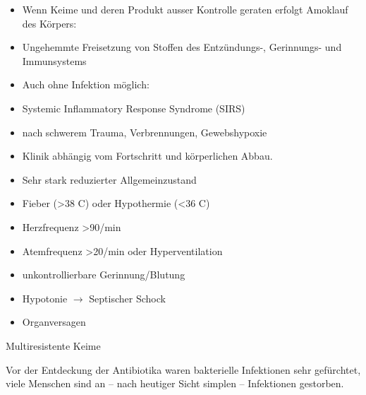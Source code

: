 \documentclass{article}
\newcommand\gZ[1]{\textcolor[rgb]{0.5019608,0.5019608,0.5019608}{#1}}
\begin{document}
\begin{itemize}
\item {\mdseries
Wenn Keime und deren Produkt ausser Kontrolle geraten erfolgt Amoklauf
des K\"orpers:}

\item {\mdseries
Ungehemmte Freisetzung von Stoffen des Entz\"undungs-, Gerinnungs- und
Immunsystems}

\item {\mdseries
Auch ohne Infektion m\"oglich:}

\end{itemize}
\begin{itemize}
\item {\mdseries
\gZ{Systemic Inflammatory Response Syndrome (SIRS) }}

\end{itemize}
\begin{itemize}
\item {\mdseries
nach schwerem Trauma, Verbrennungen, Gewebshypoxie}

\item {\mdseries
Klinik abh\"angig vom Fortschritt und k\"orperlichen Abbau.}

\end{itemize}
\begin{itemize}
\item {\mdseries
Sehr stark reduzierter Allgemeinzustand}

\item {\mdseries
Fieber ({\textgreater}38{\textdegree} C) oder Hypothermie
({\textless}36{\textdegree} C)}

\item {\mdseries
Herzfrequenz {\textgreater}90/min}

\item {\mdseries
Atemfrequenz {\textgreater}20/min oder Hyperventilation}

\item {\mdseries
unkontrollierbare Gerinnung/Blutung}

\item {\mdseries
Hypotonie ${\rightarrow}$ Septischer Schock}

\item {\mdseries
Organversagen  }

\end{itemize}
{\mdseries\color[rgb]{0.0,0.0,0.5019608}
Multiresistente Keime}

{\mdseries
Vor der Entdeckung der Antibiotika waren bakterielle Infektionen sehr
gef\"urchtet, viele Menschen sind an -- nach heutiger Sicht simplen --
Infektionen gestorben. }
\end{document}
